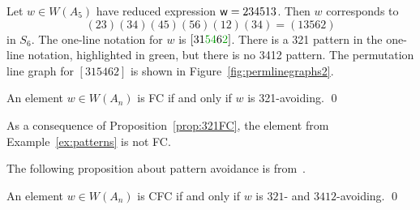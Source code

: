 \begin{example}\label{ex:patterns} Let $w \in W(A_5)$ have reduced expression $\mathsf{w} = 234513$. Then $w$ corresponds to $$(23)(34)(45)(56)(12)(34) = (13562)$$ in $S_6$. The one-line notation for $w$ is $[31\textcolor{ggreen}{54}6\textcolor{ggreen}{2}]$. 
    There is a 321 pattern in the one-line notation, highlighted in \textcolor{ggreen}{green}, but there is no 3412 pattern. The permutation line graph for $[315462]$ is shown in Figure~\ref{fig:permlinegraphs2}.
\end{example}

\begin{proposition}\label{prop:321FC} An element $w \in W(A_n)$ is FC if and only if $w$ is 321-avoiding. \qed
\end{proposition}

    As a consequence of Proposition~\ref{prop:321FC}, the element from Example~\ref{ex:patterns} is not FC.
    
    The following proposition about pattern avoidance is from~\cite{Boothby2012}.
    
\begin{proposition}\label{prop:patterns} An element $w \in W(A_n)$ is CFC if and only if $w$ is $321$- and $3412$-avoiding. \qed
\end{proposition}

